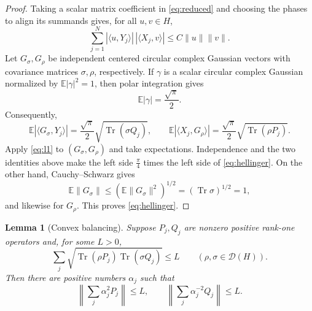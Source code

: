 \documentclass[11pt]{article}
\newtheorem{lemma}{Lemma}
\newcommand{\Dens}{\mathcal D}
\newcommand{\Tr}{\operatorname{Tr}}
\begin{document}
\begin{proof}
Taking a scalar matrix coefficient in \eqref{eq:reduced} and choosing the
phases to align its summands gives, for all $u,v\in H$,
\begin{equation}\label{eq:l1}
 \sum_{j=1}^N
 |\langle u,Y_j\rangle|\,|\langle X_j,v\rangle|
 \leq C\|u\|\|v\|.
\end{equation}
Let $G_\sigma,G_\rho$ be independent centered circular complex Gaussian
vectors with covariance matrices $\sigma,\rho$, respectively.  If $\gamma$
is a scalar circular complex Gaussian normalized by
$\mathbb E|\gamma|^2=1$, then polar integration gives
\begin{equation}\label{eq:gaussmoment}
 \mathbb E|\gamma|=\frac{\sqrt\pi}{2}.
\end{equation}
Consequently,
\[
 \mathbb E|\langle G_\sigma,Y_j\rangle|
   =\frac{\sqrt\pi}{2}\sqrt{\Tr(\sigma Q_j)},\qquad
 \mathbb E|\langle X_j,G_\rho\rangle|
   =\frac{\sqrt\pi}{2}\sqrt{\Tr(\rho P_j)}.
\]
Apply \eqref{eq:l1} to $(G_\sigma,G_\rho)$ and take expectations.
Independence and the two identities above make the left side
$\frac\pi4$ times the left side of \eqref{eq:hellinger}.  On the other hand,
Cauchy--Schwarz gives
\[
 \mathbb E\|G_\sigma\|\leq
 (\mathbb E\|G_\sigma\|^2)^{1/2}=(\Tr\sigma)^{1/2}=1,
\]
and likewise for $G_\rho$.  This proves \eqref{eq:hellinger}.
\end{proof}

\begin{lemma}[Convex balancing]\label{lem:balance}
Suppose $P_j,Q_j$ are nonzero positive rank-one operators and, for some
$L>0$,
\begin{equation}\label{eq:abstracthell}
 \sum_j\sqrt{\Tr(\rho P_j)\Tr(\sigma Q_j)}\leq L
 \qquad(\rho,\sigma\in\Dens(H)).
\end{equation}
Then there are positive numbers $\alpha_j$ such that
\begin{equation}\label{eq:balancedbounds}
 \left\|\sum_j\alpha_j^2P_j\right\|\leq L,
 \qquad
 \left\|\sum_j\alpha_j^{-2}Q_j\right\|\leq L.
\end{equation}
\end{lemma}
\end{document}
